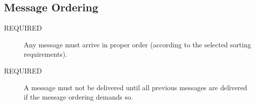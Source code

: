 \documentclass[a4paper,english]{article}
\begin{document}
\subsection{Message Ordering}
\begin{description}
\item[REQUIRED] Any message must arrive in proper order (according to the selected sorting requirements).

\item[REQUIRED] A message must not be delivered until all previous messages are delivered if the message ordering demands so.
\end{description}
\end{document}
